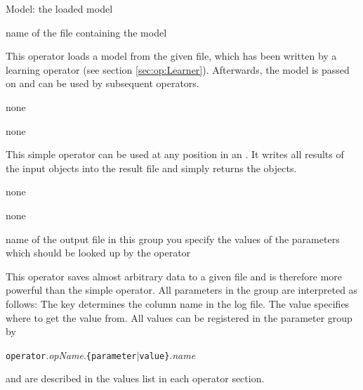 \begin{opout}
\item[Model:] the loaded model
\end{opout}

\begin{parameters}
 name of the file containing the model
\end{parameters}

\opdescr This operator loads a model from the given file, which has been written by a
learning operator (see section \ref{sec:op:Learner}). Afterwards, the
model is passed on and can be used by subsequent operators.



\begin{opin}
\item none
\end{opin}

\begin{opout}
\item none
\end{opout}

\opdescr This simple operator can be used at any position in an
. It writes all results of the input objects into
the result file and simply returns the objects. 




\begin{opin}
\item none
\end{opin}

\begin{opout}
\item none
\end{opout}

\begin{parameters}
\reqpar[filename] name of the output file
\reqpar[log] in this group you specify the values of the parameters
  which should be looked up by the operator
\end{parameters}

\opdescr This operator saves almost arbitrary data to a given file and
is therefore more powerful than the simple 
operator. All parameters in the group  are interpreted as
follows: The key determines the column name in the log file. The value
specifies where to get the value from. All values can be registered in
the  parameter group by 
\begin{center}
\texttt{operator}.\textit{opName}.\texttt{\{parameter$|$value\}}.\textit{name}
\end{center}
and are described in the values list in each operator section. 


